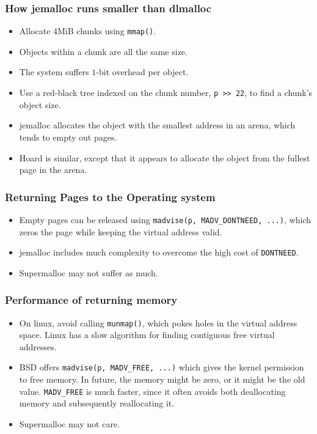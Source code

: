\documentclass[xcolor=dvipsnames,14pt]{beamer}
\begin{document}
\begin{frame}
\frametitle{How jemalloc runs smaller than dlmalloc}

\begin{itemize}
\item Allocate 4MiB chunks using \texttt{mmap()}.
\item Objects within a chunk are all the same size. 
\item The system suffers $1$-bit overhead per object.
\item Use a red-black tree indexed on the chunk number, \texttt{p >> 22}, to find a chunk's object size.
\item jemalloc allocates the object with the smallest address in an arena,
which tends to empty out pages.
\item Hoard is similar, except that it appears to allocate the object from the fullest page in the arena.
\end{itemize}
\end{frame}

\begin{frame}
\frametitle{Returning Pages to the Operating system}

\begin{itemize}
\item Empty pages can be released using
\texttt{madvise(p, MADV_DONTNEED, ...)}, which zeros the page while keeping the virtual address valid.

\item jemalloc includes much complexity to overcome the high cost of
  \texttt{DONTNEED}.

\item Supermalloc may not suffer as much.
\end{itemize}
\end{frame}

\begin{frame}
\frametitle{Performance of returning memory}

\begin{itemize}

\item On linux, avoid calling \texttt{munmap()}, which pokes
  holes in the virtual address space.  Linux has a slow algorithm for
  finding contiguous free virtual addresses.

\item BSD offers \texttt{madvise(p, MADV_FREE, ...)} which
  gives the kernel permission to free memory.  In future, the memory
  might be zero, or it might be the old value.
  \texttt{MADV_FREE} is much faster, since it often avoids both
  deallocating memory and subsequently reallocating it.

\item Supermalloc may not care.
\end{itemize}
\end{frame}
\end{document}
